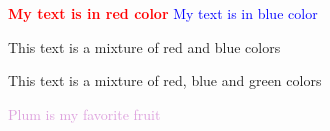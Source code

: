\documentclass{article}
\begin{document}
    \pagecolor{Goldenrod!50}
    \textcolor{red}{\textbf{My text is in red color}}
    \textcolor{blue}{My text is in blue color}


    \textcolor{red!50!blue}{This text is a mixture of red and blue colors}

    \textcolor{red!50!blue!50!green}{This text is a mixture of red, blue and green colors}

    \textcolor{Plum}{Plum is my favorite fruit}
\end{document}
